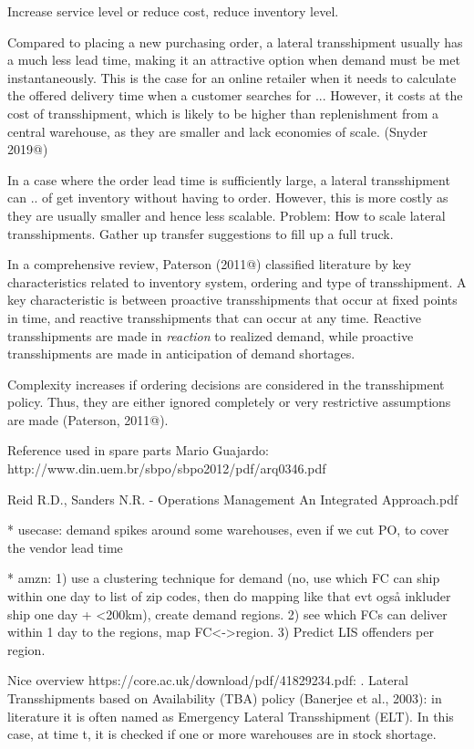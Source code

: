 \documentclass[../../main.tex]{subfiles}
\begin{document}
Increase service level or reduce cost, reduce inventory level.

Compared to placing a new purchasing order, a lateral transshipment usually has a much less lead time, making it an attractive option when demand must be met instantaneously. This is the case for an online retailer when it needs to calculate the offered delivery time when a customer searches for ... However, it costs at the cost of transshipment, which is likely to be higher than replenishment from a central warehouse, as they are smaller and lack economies of scale. (Snyder 2019@)

In a case where the order lead time is sufficiently large, a lateral transshipment can .. of get inventory without having to order. However, this is more costly as they are usually smaller and hence less scalable. Problem: How to scale lateral transshipments. Gather up transfer suggestions to fill up a full truck.

In a comprehensive review, Paterson (2011@) classified literature by key characteristics related to inventory system, ordering and type of transshipment. A key characteristic is between proactive transshipments that occur at fixed points in time, and reactive transshipments that can occur at any time. Reactive transshipments are made in \textit{reaction} to realized demand, while proactive transshipments are made in anticipation of demand shortages. 

Complexity increases if ordering decisions are considered in the transshipment policy. Thus, they are either ignored completely or very restrictive assumptions are made (Paterson, 2011@). 

Reference used in spare parts Mario Guajardo: http://www.din.uem.br/sbpo/sbpo2012/pdf/arq0346.pdf


Reid R.D., Sanders N.R. - Operations Management An Integrated Approach.pdf


* usecase: demand spikes around some warehouses, even if we cut PO, to cover the vendor lead time

* amzn: 1) use a clustering technique for demand (no, use which FC can ship within one day to list of zip codes, then do mapping like that evt også inkluder ship one day + <200km), create demand regions. 2) see which FCs can deliver within 1 day to the regions, map FC<->region. 3) Predict LIS offenders per region. 

Nice overview https://core.ac.uk/download/pdf/41829234.pdf:
. Lateral Transshipments based on Availability (TBA) policy (Banerjee et al., 2003): in literature it is often named as Emergency Lateral Transshipment (ELT). In this case, at time t, it is checked if one or more warehouses are in stock shortage. 



\end{document}
